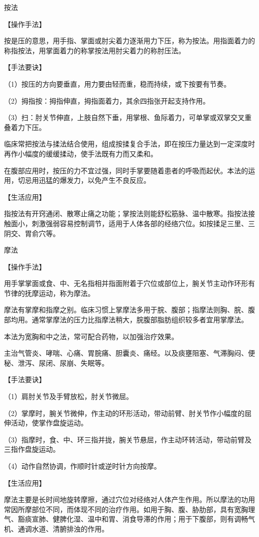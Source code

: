 \documentclass[12pt,UTF8,openany]{ctexbook}
\begin{document}
按法

【操作手法】

按是压的意思，用手指、掌面或肘尖着力逐渐用力下压，称为按法。用指面着力的称指按法，用掌面着力的称掌按法用肘尖着力的称肘压法。

【手法要诀】

（1）按压的方向要垂直，用力要由轻而重，稳而持续，或下按要有节奏。

（2）拇指按：拇指伸直，拇指面着力，其余四指张开起支持作用。

（3）扫：肘关节伸直，上肢自然下垂，用掌根、鱼际着力，可单掌或双掌交叉重叠着力下压。

临床常把按法与揉法结合使用，组成按揉复合手法，即在按压力量达到一定深度时再作小幅度的缓缓揉动，使手法既有力而又柔和。

在腹部应用时，按压的力不宜过强，同时手掌要随着患者的呼吸而起伏。本法的运用，切忌用迅猛的爆发力，以免产生不良反应。

【生活应用】

指按法有开窍通闭、散寒止痛之功能；掌按法则能舒松筋脉、温中散寒。指按法接触面小，刺激强弱容易控制调节，适用于人体各部的经络穴位。如按揉足三里、三阴交、胃俞穴等。

摩法

【操作手法】

用手掌掌面或食、中、无名指相并指面附着于穴位或部位上，腕关节主动作环形有节律的抚摩运动，称为摩法。

摩法有掌摩和指摩之别。临床习惯上掌摩法多用于脘、腹部；指摩法则胸、脘、腹部均用。通常掌摩法的压力比指摩法稍大，脘腹部脂肪组织较多者宜用掌摩法。

本法为宽胸和中之法，常可配合药物，以加强治疗效果。

主治气管炎、哮喘、心痛、胃脘痛、胆囊炎、痛经。以及痰壅阻塞、气滞胸闷、便秘、泄泻、尿闭、尿崩、失眠等。

【手法要诀】

（1）肩肘关节及手臂放松，肘关节微屈。

（2）掌摩时，腕关节微伸，作主动的环形活动，带动前臂、肘关节作小幅度的屈伸活动，使掌作盘旋运动。

（3）指摩时，食、中、环三指并拢，腕关节悬屈，作主动环转活动，带动前臂及三指作盘旋运动。

（4）动作自然协调，作顺时针或逆时针方向按摩。

【生活应用】

摩法主要是长时间地旋转摩擦，通过穴位对经络对人体产生作用。所以摩法的功用常因所摩部位不同，而体现不同的治疗作用。如用于胸、腹、胁肋部，具有宽胸理气、豁痰宣肺、健脾化湿、温中和胃、消食导滞的作用；用于下腹部，则有调畅气机、通调水道、清腑排浊的作用。
\end{document}
